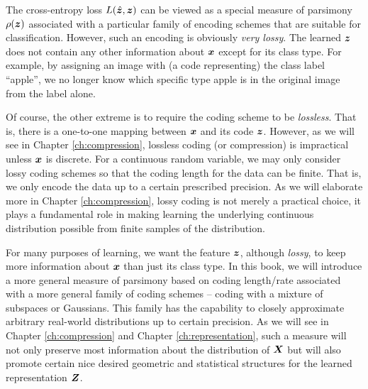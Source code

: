 \documentclass[\toplevelprefix/book-main.tex]{subfiles}
\begin{document}
The cross-entropy loss $L(\hat {\bm{z}}, \bm{z})$ can be viewed as a special measure of parsimony $\rho(\bm{z})$ associated with a particular family of encoding schemes that are suitable for classification. However, such an encoding is obviously {\em very lossy}. The learned $\bm{z}$ does not contain any other information about $\bm{x}$ except for its class type. For example, by assigning an image with (a code representing) the class label ``apple'', we no longer know which specific type apple is in the original image from the label alone. 

Of course, the other extreme is to require the coding scheme to be {\em lossless}. That is, there is a one-to-one mapping between $\bm{x}$ and its code $\bm{z}$. However, as we will see in Chapter \ref{ch:compression},  lossless coding (or compression) is impractical unless $\bm{x}$ is discrete. For a continuous random variable, we may only consider lossy coding schemes so that the coding length for the data can be finite. That is, we only encode the data up to a certain prescribed precision. As we will elaborate more in Chapter \ref{ch:compression}, lossy coding is not merely a practical choice, it plays a fundamental role in making learning the underlying continuous distribution possible from finite samples of the distribution. 

For many purposes of learning, we want the feature $\bm{z}$, although {\em lossy}, to keep more information about $\bm{x}$ than just its class type. In this book, we will introduce a more general measure of parsimony based on coding length/rate associated with a more general family of coding schemes -- coding with a mixture of subspaces or Gaussians. This family has the capability to closely approximate arbitrary real-world distributions up to certain precision. As we will see in Chapter \ref{ch:compression} and Chapter \ref{ch:representation}, such a measure will not only preserve most information about the distribution of $\bm{X}$ but will also promote certain nice desired geometric and statistical structures for the learned representation $\bm{Z}$. 
\end{document}
